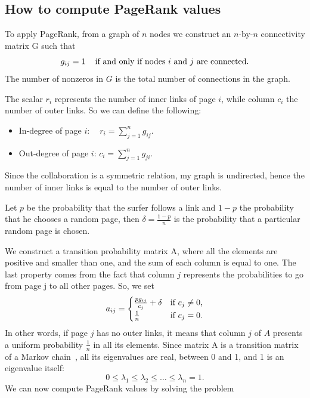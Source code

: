 \documentclass[]{usiinfbachelorproject}
\newcommand\tab[1][1cm]{\hspace*{#1}}
\begin{document}
\subsection{How to compute PageRank values}
To apply PageRank, from a graph of $n$ nodes we construct an $n$-by-$n$ connectivity matrix G such that
\begin{equation*}
g_{ij}=1 \text{\;\;\; if and only if nodes $i$ and $j$ are connected.} 
\end{equation*}
The number of nonzeros in $G$ is the total number of connections in the graph.

The scalar $r_i$ represents the number of inner links of page $i$, while column $c_i$ the number of outer links. So we can define the following:
\begin{itemize}
\item In-degree of page $i$: \tab $\:\:\:\:r_i = \sum\limits_{j=1}^{n} g_{ij}$.
\item Out-degree of page $i$: \tab $c_i = \sum\limits_{j=1}^{n} g_{ji}$.
\end{itemize}
Since the collaboration is a symmetric relation, my graph is undirected, hence the number of inner links is equal to the number of outer links. 

Let $p$ be the probability that the surfer follows a link and $1-p$ the probability that he chooses a random page, then $\delta = \frac{1-p}{n}$ is the probability that a particular random page is chosen.

We construct a transition probability matrix A, where all the elements are positive and smaller than one, and the sum of each column is equal to one.
The last property comes from the fact that column $j$ represents the probabilities to go from page j to all other pages. So, we set
\begin{equation}\notag
a_{ij} = 
\begin{cases}
\frac{pg_{ij}}{c_{j}} + \delta  & \text{if } c_{j} \neq 0 \text{,}\\
\frac{1}{n} & \text{if } c_{j} = 0 \text{.}
\end{cases}
\end{equation}
In other words, if page $j$ has no outer links, it means that column $j$ of $A$ presents a uniform probability $\frac{1}{n}$ in all its elements. Since matrix A is a transition matrix of a Markov chain~\cite[Chapter 7]{markov}, all its eigenvalues are real, between 0 and 1, and 1 is an eigenvalue itself:
$$0 \leq \lambda_1 \leq \lambda_2 \leq \dots \leq \lambda_n = 1 \text{.}$$
We can now compute PageRank values by solving the problem 
\end{document}
